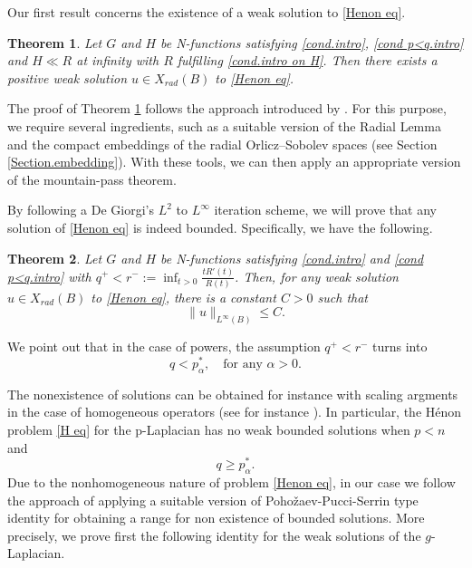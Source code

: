 \documentclass[leqno,twoside, 12pt]{amsart}
\theoremstyle{plain}
\numberwithin{equation}{section} \numberwithin{figure}{section}
\newtheorem{theorem}{Theorem}[section]
\theoremstyle{definition}
\numberwithin{equation}{section}
\begin{document}
Our first result concerns the existence of a weak solution to \eqref{Henon eq}.

\begin{theorem} \label{teo1}
Let $G$ and $H$ be N-functions satisfying \eqref{cond.intro}, \eqref{cond p<q.intro} and  $H\ll R$ at infinity with $R$ fulfilling \eqref{cond.intro on H}. Then there exists a positive weak solution $u\in X_{rad}(B)$ to \eqref{Henon eq}.
\end{theorem}

The proof of Theorem \ref{teo1} follows the approach introduced by \cite{Ni}. For this purpose, we require several ingredients, such as a suitable version of the Radial Lemma and the compact embeddings of the  radial Orlicz–Sobolev spaces (see Section \ref{Section.embedding}). With these tools, we can then apply an appropriate version of the mountain-pass theorem.


By following a De Giorgi's $L^2$ to $L^{\infty}$ iteration scheme, we will prove that any solution of \eqref{Henon eq} is indeed bounded. Specifically, we have the following.


 
\begin{theorem} \label{teo_boundedness}
Let $G$ and $H$ be N-functions satisfying \eqref{cond.intro} and \eqref{cond p<q.intro} with $q^+ < r^{-}:= \inf_{t>0} \frac{tR'(t)}{R(t)}$. Then, for any weak solution $u\in X_{rad}(B)$ to \eqref{Henon eq}, there is a constant $C>0$ such that
$$\|u\|_{L^{\infty}(B)}\leq C.$$
\end{theorem}
We point out that in the case of powers, the assumption $q^+ < r^{-}$ turns into 
$$q<p^{*}_{\alpha}, \quad \text{for any }\alpha>0.$$
 


The nonexistence of solutions can be obtained for instance with scaling argments in the case of homogeneous operators (see for instance \cite{RoS}). In particular, the H\'enon problem \eqref{H eq} for the p-Laplacian has no weak bounded solutions when $p<n$ and 
\begin{equation*}
q\geq p_\alpha^*.
\end{equation*}
Due to the nonhomogeneous nature of problem \eqref{Henon eq}, in our case we follow the approach of applying a suitable version of Pohožaev-Pucci-Serrin type identity \cite{PuSe} for obtaining a range for non existence of bounded solutions. More precisely, we prove first the following identity for the weak solutions of the $g$-Laplacian.
\end{document}
